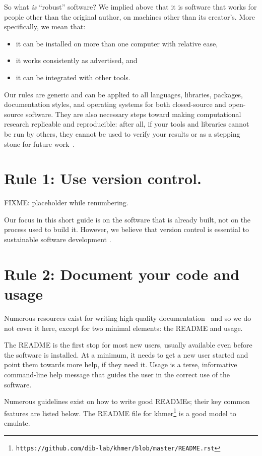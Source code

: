 \documentclass[10pt,letterpaper]{article}
\newcommand{\withurl}[2]{{#1}\footnote{\texttt{#2}}}
\newcommand{\rulemajor}[1]{\section{#1}}
\begin{document}
So what \emph{is} ``robust'' software?
We implied above that it is software that works for people other than the original author,
on machines other than its creator's.
More specifically, we mean that:

\begin{itemize}
\item
  it can be installed on more than one computer with relative ease,
\item
  it works consistently as advertised, and
\item
  it can be integrated with other tools.
\end{itemize}

Our rules are generic and can be applied to all languages, libraries, packages,
documentation styles, and operating systems for both closed-source and open-source software.  
They are also necessary steps toward making computational research replicable and reproducible:
after all,
if your tools and libraries cannot be run by others,
they cannot be used to verify your results or as a stepping stone for future work~\cite{brown2013}. 

\rulemajor{Rule 1: Use version control.}

FIXME: placeholder while renumbering.

Our focus in this short guide is on the software that is already built,
not on the process used to build it.
However,
we believe that version control is essential to sustainable software development
\cite{wilson2014,wilson2016}.

\rulemajor{Rule 2: Document your code and usage}

Numerous resources exist for writing high quality
documentation~\cite{karimzadeh2016} and so we do not cover it here, except for
two minimal elements: the README and usage.

The README is the first stop for most new users, usually available even before
the software is installed.
At a minimum, it needs to get a new user started and point them towards more
help, if they need it. Usage is a terse, informative command-line help message that
guides the user in the correct use of the software.

Numerous guidelines exist on how to write good
READMEs\cite{Johnson1997,gnustandards};
their key common features are listed below. 
The README file for \withurl{khmer}{https://github.com/dib-lab/khmer/blob/master/README.rst}
is a good model to emulate.
\end{document}
